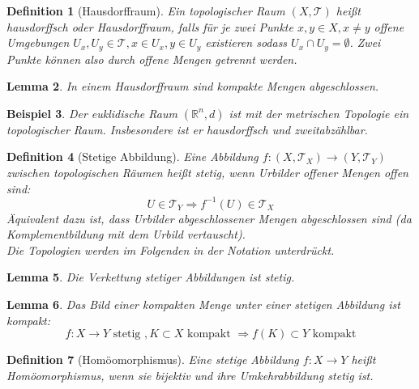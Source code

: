 \documentclass[a4paper]{scrreprt}
\numberwithin{equation}{chapter}
\newcommand{\R}{\mathds{R}}
\theoremstyle{plain}
\newtheorem{defn}{Definition}[section]
\newtheorem{lemma}[defn]{Lemma}
\newtheorem{bsp}[defn]{Beispiel}
\begin{document}
		\begin{defn}[Hausdorffraum]
			Ein topologischer Raum $(X,\mathcal{T})$ heißt hausdorffsch oder Hausdorffraum, falls für je zwei Punkte $x,y\in X, x\neq y$ offene Umgebungen $U_x,U_y\in\mathcal{T}, x\in U_x, y\in U_y$ existieren sodass $U_x\cap U_y=\emptyset$. Zwei Punkte können also durch offene Mengen \glqq getrennt \grqq werden.
		\end{defn}
		\begin{lemma}
			In einem Hausdorffraum sind kompakte Mengen abgeschlossen.
		\end{lemma}
		\begin{bsp}
			Der euklidische Raum $(\R^n,d)$ ist mit der metrischen Topologie ein topologischer Raum. Insbesondere ist er hausdorffsch und zweitabzählbar.
		\end{bsp}
		\begin{defn}[Stetige Abbildung]
			Eine Abbildung $f:(X,\mathcal{T}_X)\rightarrow (Y,\mathcal{T}_Y)$ zwischen topologischen Räumen heißt stetig, wenn Urbilder offener Mengen offen sind:
			\begin{equation*}
				U\in\mathcal{T}_Y \Rightarrow f^{-1}(U)\in\mathcal{T}_X
			\end{equation*}
			Äquivalent dazu ist, dass Urbilder abgeschlossener Mengen abgeschlossen sind (da Komplementbildung mit dem Urbild vertauscht).\\
			Die Topologien werden im Folgenden in der Notation unterdrückt.
		\end{defn}
		\begin{lemma}
			Die Verkettung stetiger Abbildungen ist stetig.
		\end{lemma}
		\begin{lemma}
			Das Bild einer kompakten Menge unter einer stetigen Abbildung ist kompakt:
			\begin{equation*}
				f:X\rightarrow Y \text{ stetig }, K\subset X \text{ kompakt }\Rightarrow f(K)\subset Y \text{ kompakt}
			\end{equation*}
		\end{lemma}
		\begin{defn}[Homöomorphismus]
			Eine stetige Abbildung $f:X\rightarrow Y$ heißt Homöomorphismus, wenn sie bijektiv und ihre Umkehrabbildung stetig ist.
		\end{defn}
\end{document}
